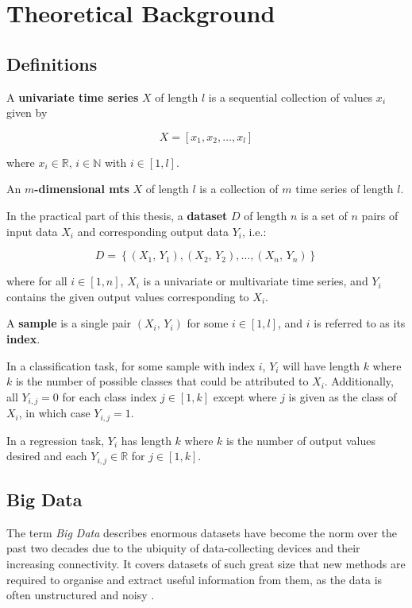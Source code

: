 \section{Theoretical Background}

\subsection{Definitions}
A \textbf{univariate time series} \(X\) of length \(l\) is a sequential collection of values \(x_{i}\) given by

\[
    X = \left[x_{1}, x_{2}, \ldots, x_{l}\right]
\]

where \(x_{i} \in \mathbb{R},\,i \in \mathbb{N}\) with \(i \in \left[1, l\right]\).

An \textbf{\(m\)-dimensional \ac{mts}} \(X\) of length \(l\) is a collection of \(m\) time series of length \(l\). %
\cite[]{ismail_fawaz_deep_2019}

In the practical part of this thesis, a \textbf{dataset} \(D\) of length \(n\) is a set of \(n\) pairs of input data \(X_i\) and corresponding output data \(Y_i\), i.e.:

\[
    D = \left\{\left(X_1,\,Y_1\right), \left(X_2,\,Y_2\right), \ldots, \left(X_n,\,Y_n\right)\right\}
\]

where for all \(i \in \left[1, n\right]\), \(X_i\) is a univariate or multivariate time series, and \(Y_i\) contains the given output values corresponding to \(X_i\).

A \textbf{sample} is a single pair \(\left(X_i,\,Y_i\right)\) for some \(i \in \left[1, l\right]\), and \(i\) is referred to as its \textbf{index}.

In a classification task, for some sample with index \(i\), \(Y_i\) will have length \(k\) where \(k\) is the number of possible classes that could be attributed to \(X_i\). Additionally, all \(Y_{i,j} = 0\) for each class index \(j \in \left[1, k\right]\) except where \(j\) is given as the class of \(X_i\), in which case \(Y_{i,j} = 1\).

In a regression task, \(Y_i\) has length \(k\) where \(k\) is the number of output values desired and each \(Y_{i,j} \in \mathbb{R}\) for \(j \in \left[1, k\right]\).

\subsection{Big Data}
The term \textit{Big Data} describes enormous datasets have become the norm over the past two decades due to the ubiquity of data-collecting devices and their increasing connectivity. It covers datasets of such great size that new methods are required to organise and extract useful information from them, as the data is often unstructured and noisy \cite[]{fan_mining_2013,chen_big_2014}.

